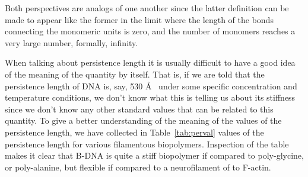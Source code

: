 Both  perspectives  are  analogs  of  one  another  since  the  latter
definition can  be made to appear  like the former in  the limit where
the length  of the bonds connecting  the monomeric units  is zero, and
the  number  of  monomers  reaches  a  very  large  number,  formally,
infinity.

When talking about persistence length  it is usually difficult to have
a good idea of the meaning of  the quantity by itself.  That is, if we
are told  that the persistence length  of DNA is, say,  530 \AA~ under
some specific concentration and  temperature conditions, we don't know
what this  is telling us about  its stiffness since we  don't know any
other standard values that can be related to this quantity.  To give a
better understanding of  the meaning of the values  of the persistence
length,  we have  collected  in Table~\ref{tab:perval}  values of  the
persistence length for various filamentous biopolymers.  Inspection of
the table  makes it clear  that B-DNA is  quite a stiff  biopolymer if
compared to poly-glycine, or poly-alanine, but flexible if compared to
a neurofilament of to F-actin.

